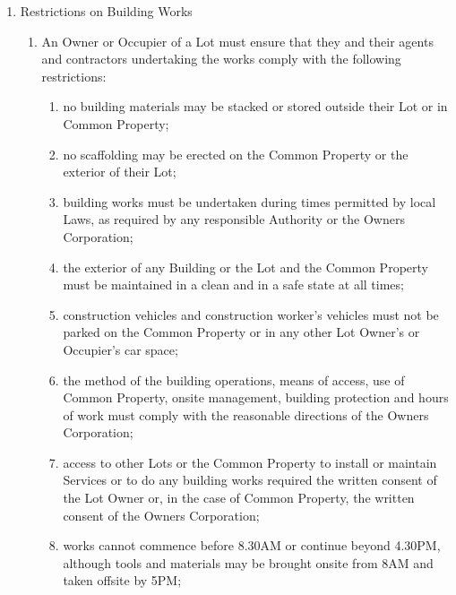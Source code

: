 \documentclass{article}
\begin{document}
\begin{enumerate}[label=\arabic*.]
\begin{enumerate}[label=\arabic{enumi}.\arabic*.]
\begin{enumerate}[label=\arabic{enumi}.\arabic*.]
\begin{enumerate}[label=(\arabic*)]
\begin{enumerate}[label=(\alph*)]
\end{enumerate}

\end{enumerate}

\item  Restrictions on Building Works

\begin{enumerate}[label=(\arabic*)]

\item  An Owner or Occupier of a Lot must ensure that they and their agents and contractors undertaking the works comply with the following restrictions:

\begin{enumerate}[label=(\alph*)]

\item  no building materials may be stacked or stored outside their Lot or in Common Property;

\item  no scaffolding may be erected on the Common Property or the exterior of their Lot;

\item  building works must be undertaken during times permitted by local Laws, as required by any responsible Authority or the Owners Corporation;

\item  the exterior of any Building or the Lot and the Common Property must be maintained in a clean and in a safe state at all times;

\item  construction vehicles and construction worker’s vehicles must not be parked on the Common Property or in any other Lot Owner’s or Occupier’s car space;

\item  the method of the building operations, means of access, use of Common Property, onsite management, building protection and hours of work must comply with the reasonable directions of the Owners Corporation;

\item  access to other Lots or the Common Property to install or maintain Services or to do any building works required the written consent of the Lot Owner or, in the case of Common Property, the written consent of the Owners Corporation;

\item  works cannot commence before 8.30AM or continue beyond 4.30PM, although tools and materials may be brought onsite from 8AM and taken offsite by 5PM;
\newpage




\end{enumerate}
\end{enumerate}
\end{enumerate}
\end{enumerate}
\end{enumerate}
\end{document}
